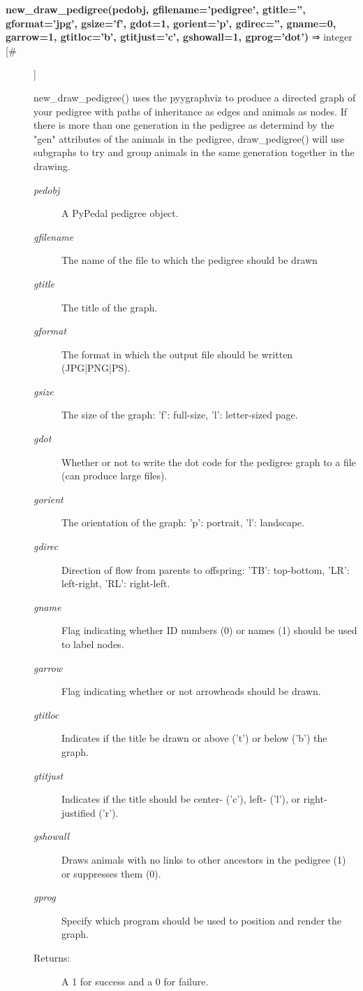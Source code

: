 \begin{description}
\item[\textbf{new\_draw\_pedigree(pedobj, gfilename='pedigree', gtitle='', gformat='jpg', gsize='f', gdot=1, gorient='p', gdirec='', gname=0, garrow=1, gtitloc='b', gtitjust='c', gshowall=1, gprog='dot')} ⇒ integer [\#]
]
\par new\_draw\_pedigree() uses the pyygraphviz to produce a directed graph of your
pedigree with paths of inheritance as edges and animals as nodes.  If there
is more than one generation in the pedigree as determind by the "gen"
attributes of the animals in the pedigree, draw\_pedigree() will use subgraphs
to try and group animals in the same generation together in the drawing.
\begin{description}
\item[\textit{pedobj}
]
A PyPedal pedigree object.
\item[\textit{gfilename}
]
The name of the file to which the pedigree should be drawn
\item[\textit{gtitle}
]
The title of the graph.
\item[\textit{gformat}
]
The format in which the output file should be written  (JPG|PNG|PS).
\item[\textit{gsize}
]
The size of the graph: 'f': full-size, 'l': letter-sized page.
\item[\textit{gdot}
]
Whether or not to write the dot code for the pedigree graph to a file (can produce large files).
\item[\textit{gorient}
]
The orientation of the graph: 'p': portrait, 'l': landscape.
\item[\textit{gdirec}
]
Direction of flow from parents to offspring: 'TB': top-bottom, 'LR': left-right, 'RL': right-left.
\item[\textit{gname}
]
Flag indicating whether ID numbers (0) or names (1) should be used to label nodes.
\item[\textit{garrow}
]
Flag indicating whether or not arrowheads should be drawn.
\item[\textit{gtitloc}
]
Indicates if the title be drawn or above ('t') or below ('b') the graph.
\item[\textit{gtitjust}
]
Indicates if the title should be center- ('c'), left- ('l'), or right-justified ('r').
\item[\textit{gshowall}
]
Draws animals with no links to other ancestors in the pedigree (1) or suppresses them (0).
\item[\textit{gprog}
]
Specify which program should be used to position and render the graph.
\item[Returns:
]
A 1 for success and a 0 for failure.
\end{description}\\


\end{description}

